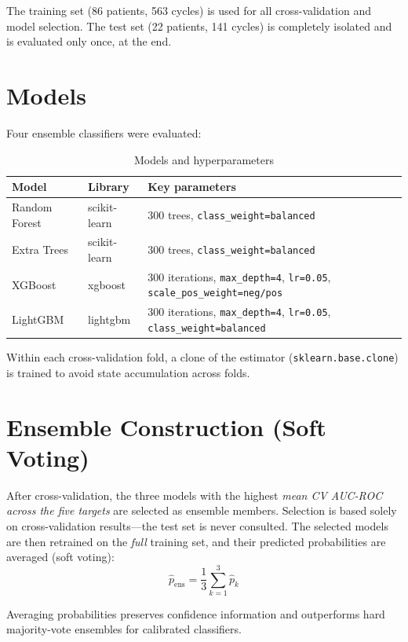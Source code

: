 \documentclass[12pt,a4paper]{report}
\begin{document}
The training set (86 patients, 563 cycles) is used for all cross-validation and model selection. The test set (22 patients, 141 cycles) is completely isolated and is evaluated only once, at the end.

\section{Models}

Four ensemble classifiers were evaluated:

\begin{table}[H]
\centering
\caption{Models and hyperparameters}
\label{tab:models}
\begin{tabular}{llp{5.5cm}}
\toprule
\textbf{Model} & \textbf{Library} & \textbf{Key parameters} \\
\midrule
Random Forest & scikit-learn & 300 trees, \texttt{class\_weight=\textquotesingle{}balanced\textquotesingle{}} \\
Extra Trees & scikit-learn & 300 trees, \texttt{class\_weight=\textquotesingle{}balanced\textquotesingle{}} \\
XGBoost & xgboost & 300 iterations, \texttt{max\_depth=4}, \texttt{lr=0.05}, \texttt{scale\_pos\_weight=neg/pos} \\
LightGBM & lightgbm & 300 iterations, \texttt{max\_depth=4}, \texttt{lr=0.05}, \texttt{class\_weight=\textquotesingle{}balanced\textquotesingle{}} \\
\bottomrule
\end{tabular}
\end{table}

Within each cross-validation fold, a clone of the estimator (\texttt{sklearn.base.clone}) is trained to avoid state accumulation across folds.

\section{Ensemble Construction (Soft Voting)}

After cross-validation, the three models with the highest \emph{mean CV AUC-ROC across the five targets} are selected as ensemble members. Selection is based solely on cross-validation results---the test set is never consulted. The selected models are then retrained on the \emph{full} training set, and their predicted probabilities are averaged (soft voting):
\[
\hat{p}_{\text{ens}} = \frac{1}{3} \sum_{k=1}^{3} \hat{p}_k
\]

Averaging probabilities preserves confidence information and outperforms hard majority-vote ensembles for calibrated classifiers.
\end{document}
